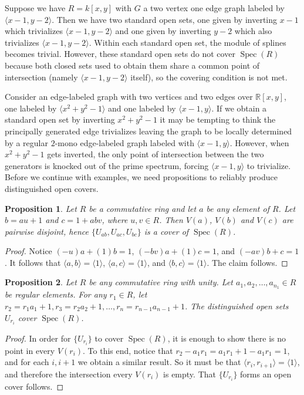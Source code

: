 \documentclass{article}
\newcommand{\R}{\mathbb R}
\DeclareMathOperator{\Spec}{Spec}
\newtheorem{proposition}{Proposition}
\begin{document}
Suppose we have $R=k[x,y]$ with $G$ a two vertex one edge graph labeled by $\langle x-1, y-2 \rangle$. Then we have two standard open sets, one given by inverting $x-1$ which trivializes $\langle x-1, y-2 \rangle$ and one given by inverting $y-2$ which also trivializes $\langle x-1, y-2 \rangle$. Within each standard open set, the module of splines becomes trivial. However, these standard open sets do not cover $\Spec(R)$ because both closed sets used to obtain them share a common point of intersection (namely $\langle x-1, y-2 \rangle$ itself), so the covering condition is not met.

Consider an edge-labeled graph with two vertices and two edges over $\R[x,y]$, one labeled by $\langle x^2+y^2-1 \rangle$ and one labeled by $\langle x-1, y \rangle$. If we obtain a standard open set by inverting $x^2+y^2-1$ it may be tempting to think the principally generated edge trivializes leaving the graph to be locally determined by a regular $2$-mono edge-labeled graph labeled with $\langle x-1, y \rangle$. However, when $x^2+y^2-1$ gets inverted, the only point of intersection between the two generators is knocked out of the prime spectrum, forcing $\langle x-1, y \rangle$ to trivialize. Before we continue with examples, we need propositions to reliably produce distinguished open covers.

\begin{proposition}
Let $R$ be a commutative ring and let $a$ be any element of $R$. Let $b = au + 1$ and $c = 1 + abv$, where $u, v \in R$. Then $V(a)$, $V(b)$ and $V(c)$ are pairwise disjoint, hence $\{U_{ab}, U_{ac}, U_{bc}\}$ is a cover of $\Spec(R)$. 
\end{proposition}
\begin{proof}
Notice $(-u)a + (1)b = 1$, $(-bv)a + (1)c = 1$, and $(-av)b + c = 1$. It follows that $\langle a, b \rangle = \langle 1 \rangle$, $\langle a, c \rangle = \langle 1 \rangle$, and $\langle b, c \rangle = \langle 1 \rangle$. The claim follows.
\end{proof}

\begin{proposition}
\label{prop:coveringR}
Let $R$ be any commutative ring with unity. Let $a_1, a_2, \dots, a_{n_1} \in R$ be regular elements. For any $r_1 \in R$, let $r_2 = r_1a_1+1, r_3 = r_2a_2 + 1, \dots, r_n = r_{n-1}a_{n-1} + 1$. The distinguished open sets $U_{r_i}$ cover $\Spec(R)$.
\end{proposition}
\begin{proof}
In order for $\{U_{r_i}\}$ to cover $\Spec(R)$, it is enough to show there is no point in every $V(r_i)$. To this end, notice that $r_2 - a_1r_1 = a_1r_1 + 1 - a_1r_1 = 1$, and for each $i, i+1$ we obtain a similar result. So it must be that $\langle r_i, r_{i+1} \rangle = \langle 1 \rangle$, and therefore the intersection every $V(r_i)$ is empty. That $\{U_{r_i}\}$ forms an open cover follows.
\end{proof}
\end{document}
